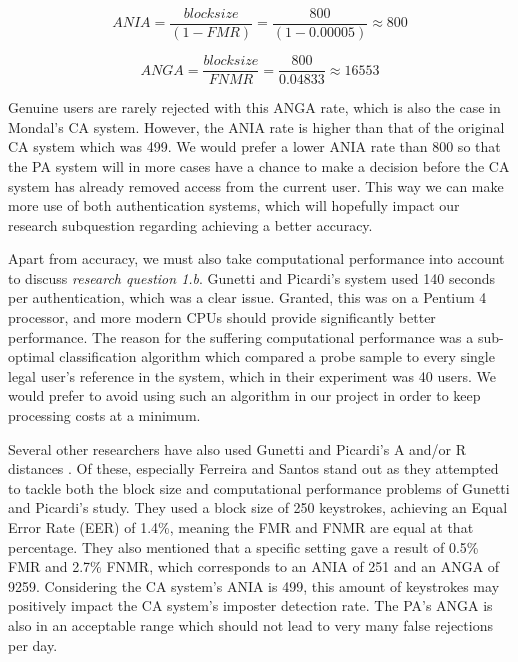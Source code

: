 \documentclass[informationsecurity]{gucmasterproject}
\begin{document}
\begin{equation}
ANIA = \frac{block size}{(1-FMR)} = \frac{800}{(1-0.00005)} \approx 800
\end{equation}

\begin{equation}
ANGA = \frac{block size}{FNMR} = \frac{800}{0.04833} \approx 16553
\end{equation}

Genuine users are rarely rejected with this ANGA rate, which is also the case in Mondal's \cite{mondal} CA system.
However, the ANIA rate is higher than that of the original CA system which was 499.
We would prefer a lower ANIA rate than 800 so that the PA system will in more cases have a chance to make a decision before the CA system has already removed access from the current user.
This way we can make more use of both authentication systems, which will hopefully impact our research subquestion regarding achieving a better accuracy.

Apart from accuracy, we must also take computational performance into account to discuss \textit{research question 1.b}.
Gunetti and Picardi's \cite{gnp} system used 140 seconds per authentication, which was a clear issue.
Granted, this was on a Pentium 4 processor, and more modern CPUs should provide significantly better performance.
The reason for the suffering computational performance was a sub-optimal classification algorithm which compared a probe sample to every single legal user's reference in the system, which in their experiment was 40 users.
We would prefer to avoid using such an algorithm in our project in order to keep processing costs at a minimum.

Several other researchers have also used Gunetti and Picardi's A and/or R distances \cite{Kolakowska2011, Messerman, meaningless, hu, davoudi2009, davoudi2010, superResults, Pinto2014, sliding}.
Of these, especially Ferreira and Santos \cite{superResults} stand out as they attempted to tackle both the block size and computational performance problems of Gunetti and Picardi's \cite{gnp} study.
They used a block size of 250 keystrokes, achieving an Equal Error Rate (EER) of 1.4\%, meaning the FMR and FNMR are equal at that percentage.
They also mentioned that a specific setting gave a result of 0.5\% FMR and 2.7\% FNMR, which corresponds to an ANIA of 251 and an ANGA of 9259.
Considering the CA system's ANIA is 499, this amount of keystrokes may positively impact the CA system's imposter detection rate.
The PA's ANGA is also in an acceptable range which should not lead to very many false rejections per day.
\end{document}
